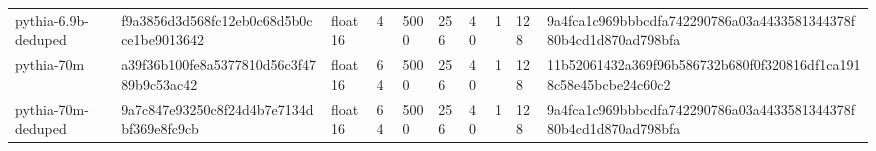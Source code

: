 \begin{tabular}{llllllllll}
pythia-6.9b-deduped & f9a3856d3d568fc12eb0c68d5b0cce1be9013642 & float16 & 4 & 5000 & 256 & 40 & 1 & 128 & 9a4fca1c969bbbcdfa742290786a03a4433581344378f80b4cd1d870ad798bfa \\
pythia-70m & a39f36b100fe8a5377810d56c3f4789b9c53ac42 & float16 & 64 & 5000 & 256 & 40 & 1 & 128 & 11b52061432a369f96b586732b680f0f320816df1ca1918c58e45bcbe24c60c2 \\
pythia-70m-deduped & 9a7c847e93250c8f24d4b7e7134dbf369e8fc9cb & float16 & 64 & 5000 & 256 & 40 & 1 & 128 & 9a4fca1c969bbbcdfa742290786a03a4433581344378f80b4cd1d870ad798bfa \\
\bottomrule
\end{tabular}
